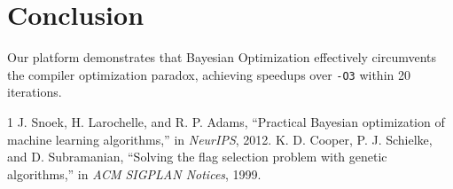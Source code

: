 \documentclass[sigconf,nonacm]{acmart}
\begin{document}
\section{Conclusion}
Our platform demonstrates that Bayesian Optimization effectively circumvents the compiler optimization paradox, achieving speedups over \texttt{-O3} within 20 iterations.


\begin{thebibliography}{1}
J. Snoek, H. Larochelle, and R. P. Adams, ``Practical Bayesian optimization of machine learning algorithms,'' in \textit{NeurIPS}, 2012.
K. D. Cooper, P. J. Schielke, and D. Subramanian, ``Solving the flag selection problem with genetic algorithms,'' in \textit{ACM SIGPLAN Notices}, 1999.
\end{thebibliography}
\end{document}
